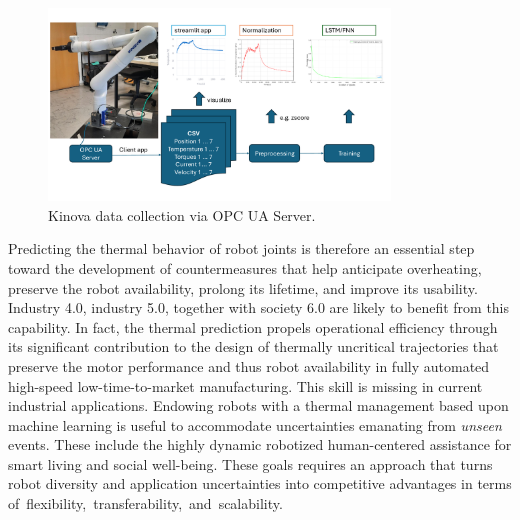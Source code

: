 \documentclass{ifacconf}
\begin{document}
\begin{figure}[t!]
	\begin{center}
		\includegraphics[width=0.81\textwidth]{pictures/DataCollection.pdf} 
		\caption{Kinova data collection via OPC UA Server.} 
		\label{fig:DataAquisition}
	\end{center}
\end{figure}

Predicting the thermal behavior of robot joints is therefore an essential step toward the development of countermeasures that help anticipate overheating, preserve the robot availability,  prolong its lifetime, and improve its usability. Industry 4.0, industry 5.0, together with society 6.0 are likely to benefit from this capability. In fact, the thermal prediction propels operational efficiency through its significant contribution to the design of thermally uncritical trajectories that  preserve the motor performance and thus robot availability in fully automated high-speed low-time-to-market manufacturing. This skill is missing in current industrial applications. Endowing robots with a thermal management based upon machine learning is useful to accommodate uncertainties emanating from \textit{unseen} events. These include the highly dynamic robotized human-centered assistance for smart living and social well-being. These goals requires an approach that turns robot diversity and application uncertainties into competitive advantages in terms \mbox{of flexibility,  transferability, and scalability.}
\end{document}

